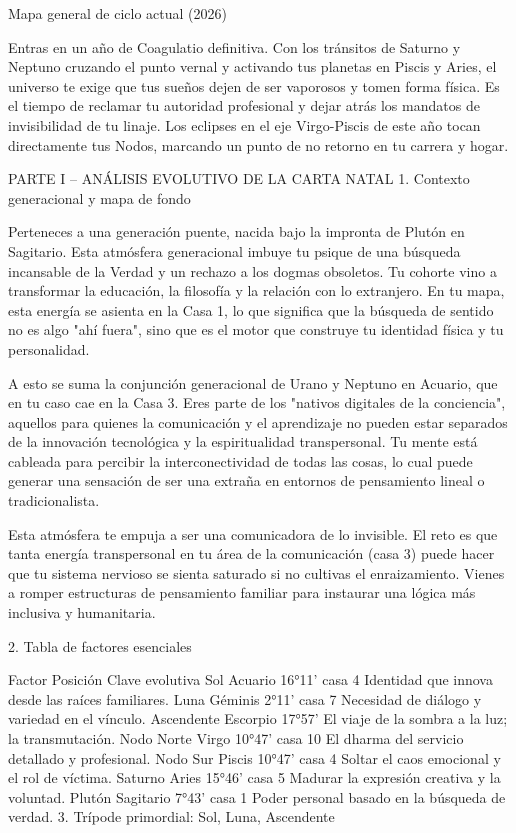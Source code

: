 Mapa general de ciclo actual (2026)

Entras en un año de Coagulatio definitiva. Con los tránsitos de Saturno y Neptuno cruzando el punto vernal y activando tus planetas en Piscis y Aries, el universo te exige que tus sueños dejen de ser vaporosos y tomen forma física. Es el tiempo de reclamar tu autoridad profesional y dejar atrás los mandatos de invisibilidad de tu linaje. Los eclipses en el eje Virgo-Piscis de este año tocan directamente tus Nodos, marcando un punto de no retorno en tu carrera y hogar.

PARTE I – ANÁLISIS EVOLUTIVO DE LA CARTA NATAL
1. Contexto generacional y mapa de fondo

Perteneces a una generación puente, nacida bajo la impronta de Plutón en Sagitario. Esta atmósfera generacional imbuye tu psique de una búsqueda incansable de la Verdad y un rechazo a los dogmas obsoletos. Tu cohorte vino a transformar la educación, la filosofía y la relación con lo extranjero. En tu mapa, esta energía se asienta en la Casa 1, lo que significa que la búsqueda de sentido no es algo "ahí fuera", sino que es el motor que construye tu identidad física y tu personalidad.

A esto se suma la conjunción generacional de Urano y Neptuno en Acuario, que en tu caso cae en la Casa 3. Eres parte de los "nativos digitales de la conciencia", aquellos para quienes la comunicación y el aprendizaje no pueden estar separados de la innovación tecnológica y la espiritualidad transpersonal. Tu mente está cableada para percibir la interconectividad de todas las cosas, lo cual puede generar una sensación de ser una extraña en entornos de pensamiento lineal o tradicionalista.

Esta atmósfera te empuja a ser una comunicadora de lo invisible. El reto es que tanta energía transpersonal en tu área de la comunicación (casa 3) puede hacer que tu sistema nervioso se sienta saturado si no cultivas el enraizamiento. Vienes a romper estructuras de pensamiento familiar para instaurar una lógica más inclusiva y humanitaria.

2. Tabla de factores esenciales

Factor	Posición	Clave evolutiva
Sol	Acuario 16°11' casa 4	Identidad que innova desde las raíces familiares.
Luna	Géminis 2°11' casa 7	Necesidad de diálogo y variedad en el vínculo.
Ascendente	Escorpio 17°57'	El viaje de la sombra a la luz; la transmutación.
Nodo Norte	Virgo 10°47' casa 10	El dharma del servicio detallado y profesional.
Nodo Sur	Piscis 10°47' casa 4	Soltar el caos emocional y el rol de víctima.
Saturno	Aries 15°46' casa 5	Madurar la expresión creativa y la voluntad.
Plutón	Sagitario 7°43' casa 1	Poder personal basado en la búsqueda de verdad.
3. Trípode primordial: Sol, Luna, Ascendente

